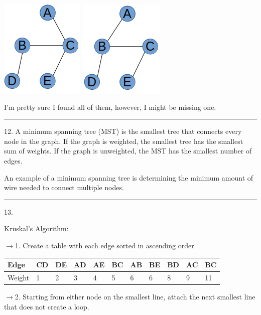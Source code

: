 \documentclass{article}
\begin{document}
\includegraphics[scale=0.5]{./P11/6}
\includegraphics[scale=0.5]{./P11/7}

I'm pretty sure I found all of them, however, I might be missing one. 

\noindent\rule{8cm}{0.4pt}

12. A minimum spanning tree (MST) is the smallest tree that connects every node in the graph. If the graph is weighted, the smallest tree has the smallest sum of weights. If the graph is unweighted, the MST has the smallest number of edges. 

An example of a minimum spanning tree is determining the minimum amount of wire needed to connect multiple nodes. 

\noindent\rule{8cm}{0.4pt}

13. 

Kruskal's Algorithm: 

$\rightarrow$1. Create a table with each edge sorted in ascending order. 
\begin{table}[H]
\begin{tabular}{|l|l|l|l|l|l|l|l|l|l|l|}
\hline
Edge & CD & DE & AD & AE & BC & AB & BE & BD & AC & BC \\ \hline
Weight & 1 & 2 & 3 & 4 & 5 & 6 & 6 & 8 & 9 & 11 \\ \hline
\end{tabular}
\end{table}


$\rightarrow$2. Starting from either node on the smallest line, attach the next smallest line that does not create a loop. 
\end{document}
